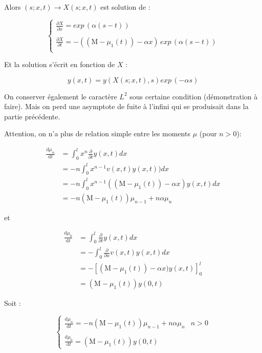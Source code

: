 \documentclass[a4paper]{article}
\theoremstyle{definition}
\theoremstyle{remark}
\newcommand{\mass}{\mathrm{M}}
\begin{document}
Alors $(s;x,t) \to X(s;x,t)$ est solution de :

\[
\begin{cases}
\displaystyle \frac{\partial X}{\partial x} = exp \, (\alpha (s-t))\\
\\
\displaystyle \frac{\partial X}{\partial t} = - ((\mass - \mu_1(t)) - \alpha x ) \, exp \, (\alpha (s-t))\\
\end{cases}
\]

Et la solution s'écrit en fonction de $X$ :

\[
y(x,t) = y(X(s;x,t),s) exp \, (- \alpha s)
\]



On conserver également le caractère $L^2$ sous certaine condition (démonstration à faire).
Mais on perd une asymptote de fuite à l'infini qui se produisait dans la partie précédente.

Attention, on n'a plus de relation simple entre les moments $\mu$ (pour $n>0$):

\[ 
\begin{split}
	\frac{\mathrm{d} \mu_n }{\mathrm{d}t} & = \int_0^l x^{n} \frac{\partial }{\partial t} y(x,t) dx \\
	                                      & = - n \int_0^l x^{n-1} v(x,t) y(x,t)) dx \\
										  & = -n \int_0^l x^{n-1} ((\mass - \mu_1(t)) - \alpha x )y(x,t) dx \\
										  & = -n (\mass - \mu_1(t)) \mu_{n-1} + n \alpha \mu_{n}
\end{split}	
\]

et

\[ 
\begin{split}
	\frac{\mathrm{d} \mu_0 }{\mathrm{d}t} & = \int_0^l \frac{\partial }{\partial t} y(x,t) dx \\
	                                      & = - \int_0^l \frac{\partial }{\partial x} v(x,t) y(x,t) dx \\
										  & = - [(\mass - \mu_1(t)) - \alpha x )y(x,t)]_0^l \\
										  & = (\mass - \mu_1(t))y(0,t)
\end{split}	
\]

Soit :

\begin{equation}
	\label{moment}
	\begin{cases}
		\displaystyle \frac{\mathrm{d} \mu_n }{\mathrm{d}t} = -n (\mass - \mu_1(t)) \mu_{n-1} + n \alpha \mu_{n} & n >0 \\
		\\
		\displaystyle \frac{\mathrm{d} \mu_0 }{\mathrm{d}t} = (\mass - \mu_1(t))y(0,t)
	\end{cases}
\end{equation}
\end{document}
